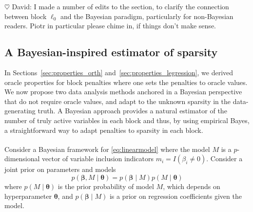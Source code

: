 \documentclass[aos]{imsart}
\theoremstyle{plain}
\newcommand{\david}[1]{{\small{\color{blue} \sf $\heartsuit$ David: #1}}}
\newcommand{\bs}{\boldsymbol}
\begin{document}
\david{I made a number of edits to the section, to clarify the connection between block $\ell_0$ and the Bayesian paradigm, particularly for non-Bayesian readers. Piotr in particular please chime in, if things don't make sense.}

\subsection{A Bayesian-inspired estimator of sparsity}

In Sections~\ref{sec:properties_orth} and~\ref{sec:properties_legression}, we derived oracle properties for block penalties where one sets the penalties to oracle values.
We now
propose two data analysis methods anchored in a Bayesian perspective
that do not require oracle values, and adapt to the unknown sparsity in the data-generating truth.
A Bayesian approach provides a natural estimator of the number of truly active variables in each block and thus, by using empirical Bayes, a straightforward way to adapt penalties to sparsity in each block.
\\
\\
Consider a Bayesian framework for \eqref{eq:linearmodel} where
the model $M$ is a $p$-dimensional vector of variable inclusion indicators $m_i=I(\beta_i \neq 0)$. Consider a joint prior on parameters and models 
\begin{equation}\label{eq:bayesianframework}
    p(\boldsymbol{\beta},M \mid \boldsymbol{\theta})=p( \boldsymbol{\beta} \mid  M) p(M \mid \boldsymbol{\theta})
\end{equation}
where $p(M \mid \boldsymbol{\theta})$ is the prior probability of model $M$, which depends on hyperparameter $\bs \theta$,
and $p( \boldsymbol{\beta} \mid  M)$ is a prior on regression coefficients given the model. 
\end{document}
